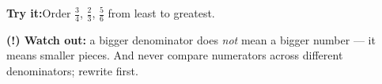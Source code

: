 \documentclass[12pt]{article}
\begin{document}
\begin{tryitbox}
\textbf{Try it:}\quad Order $\tfrac{3}{4}$, $\tfrac{2}{3}$, $\tfrac{5}{6}$
from least to greatest.\\[2pt]
\end{tryitbox}

\begin{watchoutbox}
\textbf{(!) Watch out:} a bigger denominator does \emph{not} mean a bigger
number --- it means smaller pieces. And never compare numerators across
different denominators; rewrite first.
\end{watchoutbox}
\end{document}
